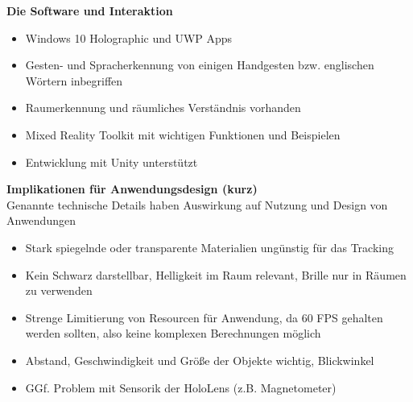 \textbf{Die Software und Interaktion}\\
\begin{itemize}
	\item Windows 10 Holographic und UWP Apps
	\item Gesten- und Spracherkennung von einigen Handgesten bzw. englischen Wörtern inbegriffen
	\item Raumerkennung und räumliches Verständnis vorhanden
	\item Mixed Reality Toolkit mit wichtigen Funktionen und Beispielen
	\item Entwicklung mit Unity unterstützt
\end{itemize}


\textbf{Implikationen für Anwendungsdesign (kurz)}\\
Genannte technische Details haben Auswirkung auf Nutzung und Design von Anwendungen
\begin{itemize}
	\item Stark spiegelnde oder transparente Materialien ungünstig für das Tracking
	\item Kein Schwarz darstellbar, Helligkeit im Raum relevant, Brille nur in Räumen zu verwenden
	\item Strenge Limitierung von Resourcen für Anwendung, da 60 FPS gehalten werden sollten, also keine komplexen Berechnungen möglich
	\item Abstand, Geschwindigkeit und Größe der Objekte wichtig, Blickwinkel
	\item GGf. Problem mit Sensorik der HoloLens (z.B. Magnetometer)
\end{itemize}
